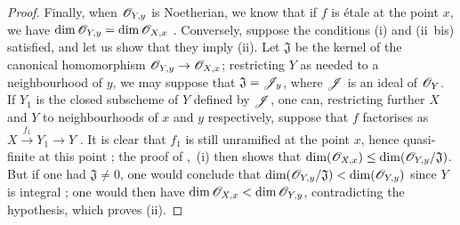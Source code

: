\begin{proof}
Finally, when $\mathscr{O}_{Y,y}$ is Noetherian, we know that if $f$ is \'etale at the point $x$, we have $\dim\mathscr{O}_{Y,y}=\dim\mathscr{O}_{X,x}$ .
Conversely, suppose the conditions (i) and (ii~bis) satisfied, and let us show that they imply (ii).
Let $\mathfrak{J}$ be the kernel of the canonical homomorphism $\mathscr{O}_{Y,y}\to\mathscr{O}_{X,x}$; restricting $Y$ as needed to a neighbourhood of $y$, we may suppose that $\mathfrak{J}=\mathscr{J}_y$, where $\mathscr{J}$ is an ideal of $\mathscr{O}_Y$.
If $Y_1$ is the closed subscheme of $Y$ defined by $\mathscr{J}$, one can, restricting further $X$ and $Y$ to neighbourhoods of $x$ and $y$ respectively, suppose that $f$ factorises as $X\xrightarrow{f_1}Y_1\to Y$ .
It is clear that $f_1$ is still unramified at the point $x$, hence quasi-finite at this point ; the proof of ,~(i) then shows that $\dim(\mathscr{O}_{X,x})\leq\dim(\mathscr{O}_{Y,y}/\mathfrak{J})$.
But if one had $\mathfrak{J}\neq 0$, one would conclude that $\dim(\mathscr{O}_{Y,y}/\mathfrak{J})<\dim(\mathscr{O}_{Y,y})$ since $Y$ is integral ; one would then have $\dim\mathscr{O}_{X,x}<\dim\mathscr{O}_{Y,y}$, contradicting the hypothesis, which proves (ii).
\end{proof}

